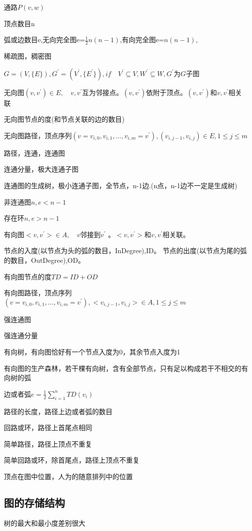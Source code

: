 \documentclass[UTF8]{ctexart}
\newcommand{\mt}[1]{\text{#1}}
\newcommand{\q}{\quad}
\newcommand{\qa}{\vspace{12 pt}}
\begin{document}
通路$P(v,w)$

顶点数目n

弧或边数目e,无向完全图e=$\frac{1}{2}n(n-1)$,有向完全图e=$n(n-1)$,

稀疏图，稠密图

$G=(V,\{E\}),G^{'}=(V^{'},\{E^{'}\}),if \q V^{'} \subseteq V,W^{'} \subseteq W,G^{'}\mt{为} G\mt{子图}$

\qa

无向图$(v,v^{'}) \in E,\q v,v^{'}$互为邻接点。$(v,v^{'})$依附于顶点。$(v,v^{'}) \mt{和}v,v^{'}$相关联

无向图节点的度(和节点关联的边的数目)

无向图路径，顶点序列$(v=v_{i,0},v_{i,1},\dots,v_{i,m}=v^{'}),(v_{i,j-1},v_{i,j}) \in E,1\leqslant j\leqslant m$

路径，连通，连通图

连通分量，极大连通子图

连通图的生成树，极小连通子图，全节点，n-1边.(n点，n-1边不一定是生成树)

非连通图$n,e<n-1$

存在环$n,e>n-1$


\qa

有向图$<v,v^{'}> \in A,\q v$邻接到$v^{'}$ 。$<v,v^{'}> \mt{和}v,v^{'}$相关联。

节点的入度(以节点为头的弧的数目，InDegree),ID。 节点的出度(以节点为尾的弧的数目，OutDegree),OD。

有向图节点的度$TD=ID+OD$

有向图路径，顶点序列$(v=v_{i,0},v_{i,1},\dots,v_{i,m}=v^{'}),<v_{i,j-1},v_{i,j}> \in A,1\leqslant j\leqslant m$

强连通图

强连通分量

有向树，有向图恰好有一个节点入度为0，其余节点入度为1

有向图的生产森林，若干棵有向树，含有全部节点，只有足以构成若干不相交的有向树的弧



\qa

边或者弧$e=\frac{1}{2}\sum_{i=1}^n TD(v_i)$ 

路径的长度，路径上边或者弧的数目

回路或环，路径上首尾点相同

简单路径，路径上顶点不重复

简单回路或环，除首尾点，路径上顶点不重复

顶点在图中位置，人为的随意排列中的位置

\subsection{图的存储结构}
树的最大和最小度差别很大
\end{document}

